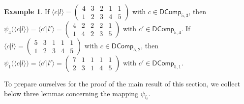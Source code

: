 \documentclass[reqno]{amsart}
\numberwithin{equation}{section}
\theoremstyle{definition}
\newtheorem{example}{Example}[section]
\theoremstyle{named}
\def\DComp{\mathsf{DComp}}
\begin{document}
\begin{example}
If $\langle c|l\rangle =\begin{pmatrix}
4 & 3 & 2 & 1 & 1\\
1 & 2 & 3 & 4 & 5
\end{pmatrix}$ with $c\in \DComp_{5,3}$, then $\psi_4(\langle c|l\rangle)=\langle c'|l'\rangle=
\begin{pmatrix}
4 & 2 & 2 & 2 & 1\\
1 & 4 & 2 & 3 & 5
\end{pmatrix}$ with $c'\in \DComp_{5,4}$. If $\langle c|l\rangle=
\begin{pmatrix}
5 & 3 & 1 & 1 & 1\\
1 & 2 & 3 & 4 & 5
\end{pmatrix}$ with $c\in \DComp_{5,2}$, then $\psi_1(\langle c|l\rangle)=\langle c'|l'\rangle=
\begin{pmatrix}
7 & 1 & 1 & 1 & 1\\
2 & 3 & 1 & 4 & 5
\end{pmatrix}$
with $c'\in \DComp_{5,1}$.
\end{example}

To prepare ourselves for the proof of the main result of this section, we collect below three lemmas concerning the mapping $\psi_{l_i}$.
\end{document}
